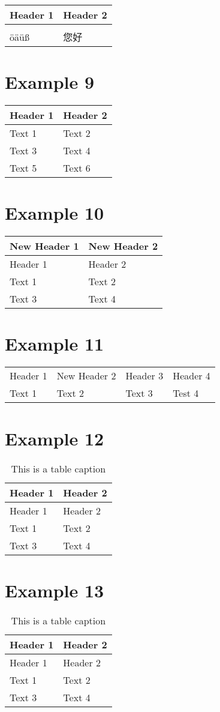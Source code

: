 \begin{longtable}[c]{@{}ll@{}}
\toprule
Header 1 & Header 2\tabularnewline
\midrule
\endhead
&\tabularnewline
öäüß & 您好\tabularnewline
\bottomrule
\end{longtable}

\section{Example 9}\label{example-9}

\begin{longtable}[c]{@{}ll@{}}
\toprule
Header 1 & Header 2\tabularnewline
\midrule
\endhead
Text 1 & Text 2\tabularnewline
Text 3 & Text 4\tabularnewline
Text 5 & Text 6\tabularnewline
\bottomrule
\end{longtable}

\section{Example 10}\label{example-10}

\begin{longtable}[c]{@{}ll@{}}
\toprule
New Header 1 & New Header 2\tabularnewline
\midrule
\endhead
Header 1 & Header 2\tabularnewline
Text 1 & Text 2\tabularnewline
Text 3 & Text 4\tabularnewline
\bottomrule
\end{longtable}

\section{Example 11}\label{example-11}

\begin{longtable}[c]{@{}llll@{}}
\toprule
Header 1 & New Header 2 & Header 3 & Header 4\tabularnewline
Text 1 & Text 2 & Text 3 & Test 4\tabularnewline
\bottomrule
\end{longtable}

\section{Example 12}\label{example-12}

\begin{longtable}[c]{@{}ll@{}}
\caption{This is a table caption}\tabularnewline
\toprule
Header 1 & Header 2\tabularnewline
\midrule
\endfirsthead
\toprule
Header 1 & Header 2\tabularnewline
\midrule
\endhead
Text 1 & Text 2\tabularnewline
Text 3 & Text 4\tabularnewline
\bottomrule
\end{longtable}

\section{Example 13}\label{example-13}

\begin{longtable}[c]{@{}ll@{}}
\caption{This is a table caption}\tabularnewline
\toprule
Header 1 & Header 2\tabularnewline
\midrule
\endfirsthead
\toprule
Header 1 & Header 2\tabularnewline
\midrule
\endhead
Text 1 & Text 2\tabularnewline
Text 3 & Text 4\tabularnewline
\bottomrule
\end{longtable}
